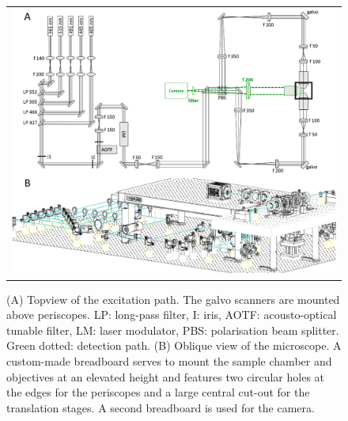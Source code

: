 \documentclass[12pt]{spieman}  %
\begin{document}
		
		\begin{figure}
   \begin{center}
   \begin{tabular}{c}
   \includegraphics[width=\textwidth]{frame1.eps}
   \end{tabular}
   \end{center}
   \caption{\label{fig:excitation} (A) Topview of the excitation path. The galvo scanners are mounted above periscopes. LP: long-pass filter, I: iris, AOTF: acousto-optical tunable filter, LM: laser modulator, PBS: polarisation beam splitter. Green dotted: detection path. (B) Oblique view of the microscope. A custom-made breadboard serves to mount the sample chamber and objectives at an elevated height and features two circular holes at the edges for the periscopes and a large central cut-out for the translation stages. A second breadboard is used for the camera.} 
   \end{figure}
\end{document}
